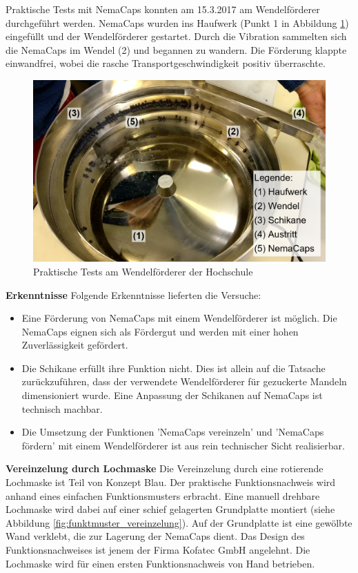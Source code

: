 Praktische Tests mit NemaCaps konnten am 15.3.2017 am Wendelförderer durchgeführt werden. NemaCaps wurden ins Haufwerk (Punkt 1 in Abbildung \ref{fig:wendelfoerderer}) eingefüllt und der Wendelförderer gestartet. Durch die Vibration sammelten sich die NemaCaps im Wendel (2) und begannen zu wandern. Die Förderung klappte einwandfrei, wobei die rasche Transportgeschwindigkeit positiv überraschte. 
\begin{figure}[H]
	\includegraphics[width=1\textwidth]{Illustrationen/5-Konzept/wendelfoerderer.PNG}
	\caption{Praktische Tests am Wendelförderer der Hochschule}
	\label{fig:wendelfoerderer}
\end{figure}
\textbf{Erkenntnisse}
\newline
Folgende Erkenntnisse lieferten die Versuche:
\begin{itemize}
	\item Eine Förderung von NemaCaps mit einem Wendelförderer ist möglich. Die NemaCaps eignen sich als Fördergut und werden mit einer hohen Zuverlässigkeit gefördert.
	
	\item Die Schikane erfüllt ihre Funktion nicht. Dies ist allein auf die Tatsache zurückzuführen, dass der verwendete  Wendelförderer für gezuckerte Mandeln dimensioniert wurde. Eine Anpassung der Schikanen auf NemaCaps ist technisch machbar.
	
	\item Die Umsetzung der Funktionen 'NemaCaps vereinzeln' und 'NemaCaps fördern' mit einem Wendelförderer ist aus rein technischer Sicht realisierbar.
\end{itemize} 
\newpage
\textbf{Vereinzelung durch Lochmaske}
\newline
Die Vereinzelung durch eine rotierende Lochmaske ist Teil von Konzept Blau. Der praktische Funktionsnachweis wird anhand eines einfachen Funktionsmusters erbracht. Eine manuell drehbare Lochmaske wird dabei auf einer schief gelagerten Grundplatte montiert (siehe Abbildung \ref{fig:funktmuster_vereinzelung}). Auf der Grundplatte ist eine gewölbte Wand verklebt, die zur Lagerung der NemaCaps dient. Das Design des Funktionsnachweises ist jenem der Firma Kofatec GmbH angelehnt. Die Lochmaske wird für einen ersten Funktionsnachweis von Hand betrieben.
